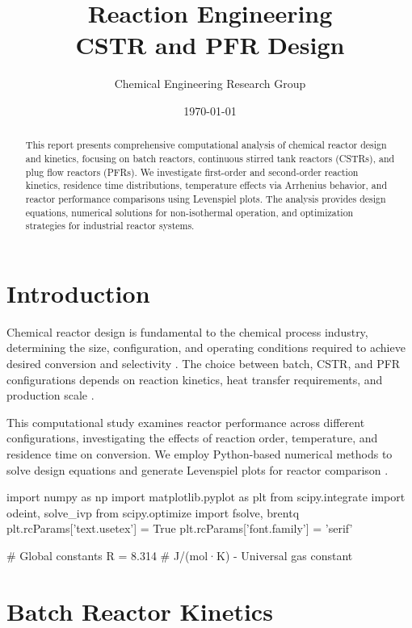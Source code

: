 \documentclass[11pt,a4paper]{article}
\title{Reaction Engineering\\CSTR and PFR Design}
\author{Chemical Engineering Research Group}
\date{\today}
\begin{document}
\maketitle

\begin{abstract}
This report presents comprehensive computational analysis of chemical reactor design and kinetics, focusing on batch reactors, continuous stirred tank reactors (CSTRs), and plug flow reactors (PFRs). We investigate first-order and second-order reaction kinetics, residence time distributions, temperature effects via Arrhenius behavior, and reactor performance comparisons using Levenspiel plots. The analysis provides design equations, numerical solutions for non-isothermal operation, and optimization strategies for industrial reactor systems.
\end{abstract}

\section{Introduction}

Chemical reactor design is fundamental to the chemical process industry, determining the size, configuration, and operating conditions required to achieve desired conversion and selectivity \cite{Fogler2016, Levenspiel1999}. The choice between batch, CSTR, and PFR configurations depends on reaction kinetics, heat transfer requirements, and production scale \cite{Smith2005}.

This computational study examines reactor performance across different configurations, investigating the effects of reaction order, temperature, and residence time on conversion. We employ Python-based numerical methods to solve design equations and generate Levenspiel plots for reactor comparison \cite{Scott2006}.

\begin{pycode}

import numpy as np
import matplotlib.pyplot as plt
from scipy.integrate import odeint, solve_ivp
from scipy.optimize import fsolve, brentq
plt.rcParams['text.usetex'] = True
plt.rcParams['font.family'] = 'serif'

# Global constants
R = 8.314  # J/(mol·K) - Universal gas constant

\end{pycode}

\section{Batch Reactor Kinetics}
\end{document}
